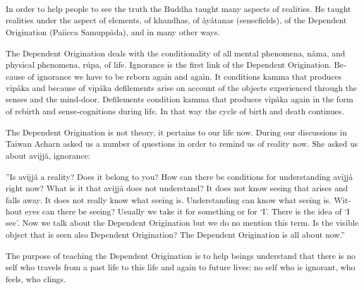 \textsuperscript{\textdutch{In order to help people to see the truth the
Buddha taught many aspects of realities. He taught realities under the
aspect of elements, of khandhas, of åyåtanas (sensefields), of the
Dependent Origination (Paìicca Samuppåda), and in many other ways. }}

\textsuperscript{\textdutch{The Dependent Origination deals with the
conditionality of all mental phenomena, nåma, and physical phenomena,
rúpa, of life. Ignorance is the first link of the Dependent Origination.
Because of ignorance we have to be reborn again and again. It conditions
kamma that produces vipåka and because of vipåka defilements arise on
account of the objects experienced through the senses and the mind-door.
Defilements condition kamma that produces vipåka again in the form of
rebirth and sense-cognitions during life. In that way the cycle of birth
and death continues. }}

\textsuperscript{\textdutch{The Dependent Origination is not theory, it
pertains to our life now. During our discussions in Taiwan Acharn asked
us a number of questions in order to remind us of reality now. She asked
us about avijjå, ignorance: }}

\textsuperscript{''\textdutch{Is avijjå a reality? Does it belong to
you? How can there be conditions for understanding
}avijj\textdanish{å}\textdutch{ right now? What is it that
}avijj\textdanish{å}\textdutch{ does not understand? It does not know
seeing that arises and falls away. It does not really know what seeing
is. Understanding can know what seeing is. Without eyes can there be
seeing? Usually we take it for something or for `I'. There is the idea
of `I see'. Now we talk about the Dependent Origination but we do no
mention this term. Is the visible object that is seen also Dependent
Origination? The Dependent Origination is all about now.''}}

\textsuperscript{\textdutch{The purpose of teaching the Dependent
Origination is to help beings understand that there is no self who
travels from a past life to this life and again to future lives; no self
who is ignorant, who feels, who clings.}}

